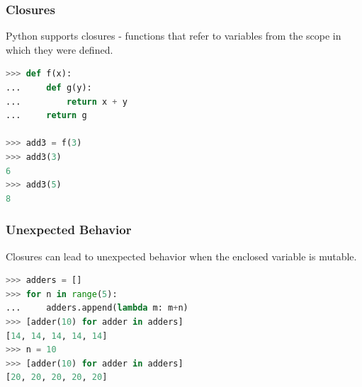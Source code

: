 \documentclass[envcountsect,10pt]{beamer}
\begin{document}
\begin{frame}[fragile]
    \frametitle{Closures}

    Python supports closures - functions that refer to variables from the scope in which they were defined.

    \begin{lstlisting}[language=Python]
>>> def f(x):
...     def g(y):
...         return x + y
...     return g

>>> add3 = f(3)
>>> add3(3)
6
>>> add3(5)
8
    \end{lstlisting}

\end{frame}

\begin{frame}[fragile]
    \frametitle{Unexpected Behavior}

    Closures can lead to unexpected behavior when the enclosed variable is mutable.

    \begin{lstlisting}[language=Python]
>>> adders = []
>>> for n in range(5):
...     adders.append(lambda m: m+n)
>>> [adder(10) for adder in adders]
[14, 14, 14, 14, 14]
>>> n = 10
>>> [adder(10) for adder in adders]
[20, 20, 20, 20, 20]
    \end{lstlisting}

\end{frame}
\end{document}
